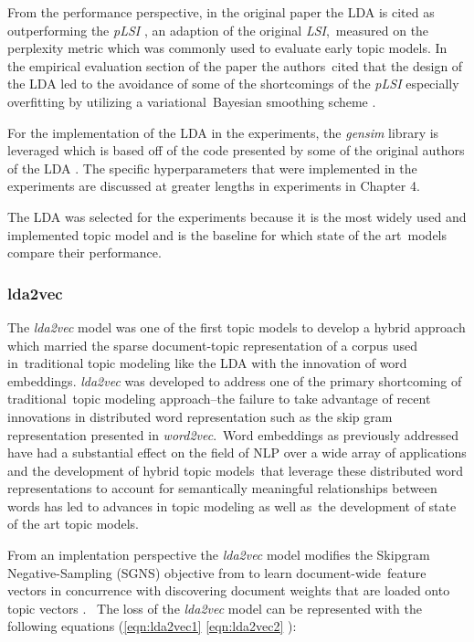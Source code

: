 \documentclass[letterpaper,12pt]{article}
\begin{document}
From the performance perspective, in the original paper the LDA is cited as outperforming the \emph{pLSI} \cite{hofmann1999probabilistic}, an adaption of the original \emph{LSI},\
measured on the perplexity metric which was commonly used to evaluate early topic models. In the empirical evaluation section of the paper the authors\
cited that the design of the LDA led to the avoidance of some of the shortcomings of the \emph{pLSI} especially overfitting by utilizing a variational\
Bayesian smoothing scheme\cite{attias2000variational} \cite{blei2003latent}. 

For the implementation of the LDA in the experiments, the \emph{gensim} library is leveraged which is based off of the code presented by some of the original authors of the LDA \cite{hoffman2010online}.
The specific hyperparameters that were implemented in the experiments are discussed at greater lengths in experiments in Chapter 4.

The LDA was selected for the experiments because it is the most widely used and implemented topic model and is the baseline for which state of the art\
models compare their performance.
\subsubsection{lda2vec}
The \emph{lda2vec} model was one of the first topic models to develop a hybrid approach which married the sparse document-topic representation of a corpus used in\
traditional topic modeling like the LDA with the innovation of word embeddings. \emph{lda2vec} was developed to address one of the primary shortcoming of traditional\
topic modeling approach--the failure to take advantage of recent innovations in distributed word representation such as the skip gram representation presented in \emph{word2vec}\cite{mikolov2013distributed}.\
Word embeddings as previously addressed have had a substantial effect on the field of NLP over a wide array of applications and the development of hybrid topic models\
that leverage these distributed word representations to account for semantically meaningful relationships between words has led to advances in topic modeling as well as\
the development of state of the art topic models.

From an implentation perspective the \emph{lda2vec} model modifies the Skipgram Negative-Sampling (SGNS) objective from \cite{mikolov2013distributed} to learn document-wide\
feature vectors in concurrence with discovering document weights that are loaded onto topic vectors \cite{moody2016mixing}. \
The loss of the \emph{lda2vec} model can be represented with the following equations (\ref{eqn:lda2vec1} \ref{eqn:lda2vec2} \cite{moody2016mixing}):
\end{document}
